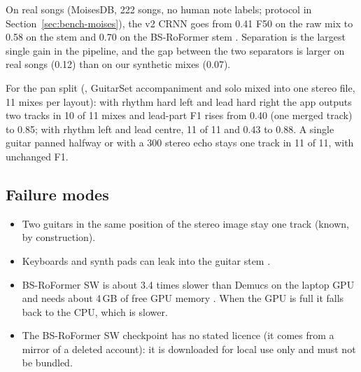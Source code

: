 On real songs (MoisesDB, 222 songs, no human note labels; protocol in
Section~\ref{sec:bench-moises}), the v2 CRNN goes from 0.41 F50 on the raw mix
to 0.58 on the  stem and 0.70 on the BS-RoFormer stem
\measured. Separation is the largest single gain in the pipeline, and the gap
between the two separators is larger on real songs (0.12) than on our synthetic
mixes (0.07).

For the pan split \measured{} (, GuitarSet accompaniment
and solo mixed into one stereo file, 11 mixes per layout): with rhythm hard left
and lead hard right the app outputs two tracks in 10 of 11 mixes and lead-part
F1 rises from 0.40 (one merged track) to 0.85; with rhythm left and lead centre,
11 of 11 and 0.43 to 0.88. A single guitar panned halfway or with a 300\ms{}
stereo echo stays one track in 11 of 11, with unchanged F1.

\subsection{Failure modes}
\begin{itemize}
\item Two guitars in the same position of the stereo image stay one track
  (known, by construction).
\item Keyboards and synth pads can leak into the guitar stem \expected.
\item BS-RoFormer SW is about 3.4 times slower than Demucs on the laptop GPU and
  needs about 4\,GB of free GPU memory \measured. When the GPU is full it falls
  back to the CPU, which is slower.
\item The BS-RoFormer SW checkpoint has no stated licence (it comes from a
  mirror of a deleted account): it is downloaded for local use only and must
  not be bundled.
\end{itemize}
